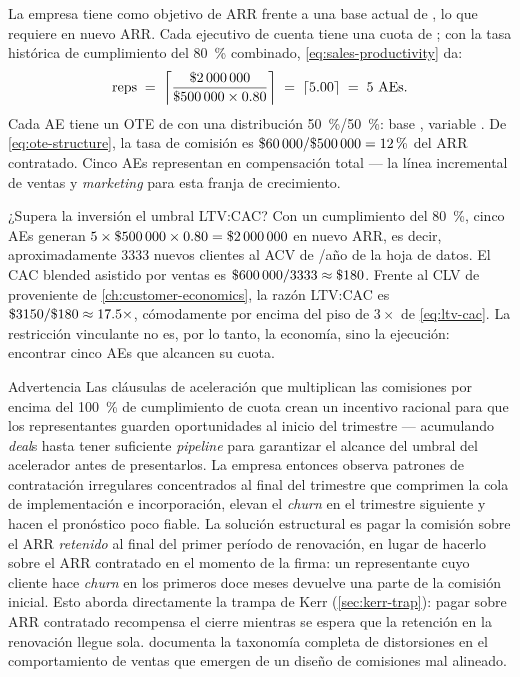 \begin{example}
La empresa tiene como objetivo  de ARR frente a una base actual de ,
lo que requiere  en nuevo ARR. Cada ejecutivo de cuenta tiene una cuota de
; con la tasa histórica de cumplimiento del \qty{80}{\percent} combinado,
\cref{eq:sales-productivity} da:
\[
  \text{reps} \;=\;
    \left\lceil\frac{\$\num{2000000}}{\$\num{500000}\times0.80}\right\rceil
    \;=\; \lceil 5.00 \rceil \;=\; 5\ \text{AEs}.
\]
Cada AE tiene un OTE de  con una distribución \qty{50}{\percent}/\qty{50}{\percent}:
base , variable . De \cref{eq:ote-structure}, la tasa de comisión es
\(\$\num{60000}/\$\num{500000} = \qty{12}{\percent}\) del ARR contratado. Cinco AEs representan
 en compensación total --- la línea incremental de ventas y \emph{marketing} para
esta franja de crecimiento.

¿Supera la inversión el umbral LTV:CAC? Con un cumplimiento del \qty{80}{\percent}, cinco AEs
generan \(5\times\$\num{500000}\times0.80=\$\num{2000000}\) en nuevo ARR, es decir, aproximadamente
\num{3333} nuevos clientes al ACV de /año de la hoja de datos. El CAC blended asistido
por ventas es \(\$\num{600000}/\num{3333}\approx\$\num{180}\). Frente al CLV de 
proveniente de \cref{ch:customer-economics}, la razón LTV:CAC es
\(\$\num{3150}/\$\num{180}\approx17.5\times\), cómodamente por encima del piso de \(3\times\) de
\cref{eq:ltv-cac}. La restricción vinculante no es, por lo tanto, la economía, sino la ejecución:
encontrar cinco AEs que alcancen su cuota.
\end{example}

\begin{admonition}{Advertencia}
Las cláusulas de aceleración que multiplican las comisiones por encima del \qty{100}{\percent} de
cumplimiento de cuota crean un incentivo racional para que los representantes guarden
oportunidades al inicio del trimestre --- acumulando \emph{deal}s hasta tener suficiente
\emph{pipeline} para garantizar el alcance del umbral del acelerador antes de presentarlos. La
empresa entonces observa patrones de contratación irregulares concentrados al final del trimestre
que comprimen la cola de implementación e incorporación, elevan el \emph{churn} en el trimestre
siguiente y hacen el pronóstico poco fiable. La solución estructural es pagar la comisión sobre
el ARR \textit{retenido} al final del primer período de renovación, en lugar de hacerlo sobre el
ARR contratado en el momento de la firma: un representante cuyo cliente hace \emph{churn} en los
primeros doce meses devuelve una parte de la comisión inicial. Esto aborda directamente la trampa
de Kerr (\cref{sec:kerr-trap}): pagar sobre ARR contratado recompensa el cierre mientras se
espera que la retención en la renovación llegue sola. \textcite{dixon2011challenger} documenta la
taxonomía completa de distorsiones en el comportamiento de ventas que emergen de un diseño de
comisiones mal alineado.
\end{admonition}

